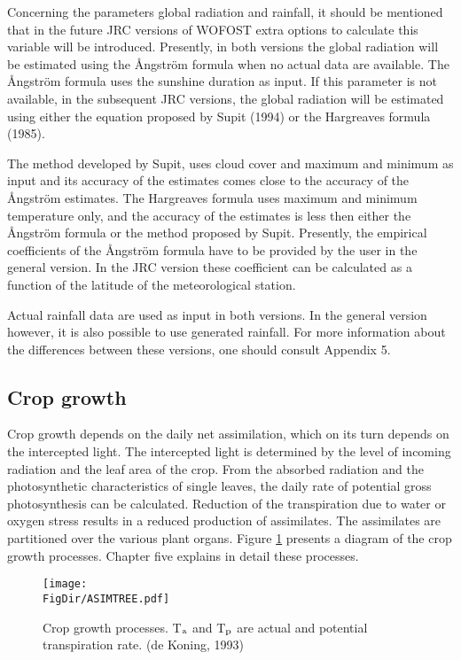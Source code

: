 Concerning the parameters global radiation and rainfall, it should be mentioned that in the
future JRC versions of WOFOST extra options to calculate this variable will be introduced. 
Presently, in both versions the global radiation will be estimated using the \AA ngstr\"{o}m 
formula when no actual data are available. The \AA ngstr\"{o}m formula uses the sunshine
duration as input. If this parameter is not available, in the subsequent JRC versions, the
global radiation will be estimated using either the equation proposed by Supit (1994) or
the Hargreaves formula (1985). 

The method developed by Supit, uses cloud cover and
maximum and minimum as input and its accuracy of the estimates comes close to the
accuracy of the \AA ngstr\"{o}m estimates. The Hargreaves formula uses maximum and
minimum temperature only, and the accuracy of the estimates is less then either the 
\AA ngstr\"{o}m formula or the method proposed by Supit.
Presently, the empirical coefficients of the \AA ngstr\"{o}m formula have to be provided by the
user in the general version. In the JRC version these coefficient can be calculated as a
function of the latitude of the meteorological station.

Actual rainfall data are used as input in both versions. In the general version however, it
is also possible to use generated rainfall. For more information about the differences
between these versions, one should consult Appendix 5.

\subsection{Crop growth}
Crop growth depends on the daily net assimilation, which on its turn depends on the
intercepted light. The intercepted light is determined by the level of incoming radiation
and the leaf area of the crop. From the absorbed radiation and the photosynthetic
characteristics of single leaves, the daily rate of potential gross photosynthesis can be
calculated. Reduction of the transpiration due to water or oxygen stress results in a
reduced production of assimilates. The assimilates are partitioned over the various plant
organs. Figure \ref{fig:CropGrowthProcesses} presents a diagram of the crop growth processes. 
Chapter five explains in detail these processes.

\begin{figure}[htbp]
\centering
\texttt{[image: \\FigDir/ASIMTREE.pdf]}
\caption{Crop growth processes. {\small T$_{{\rm a}}$ and T$_{{\rm p}}$ are actual and 
potential transpiration rate.} (de Koning, 1993)}
\label{fig:CropGrowthProcesses}
\end{figure}

